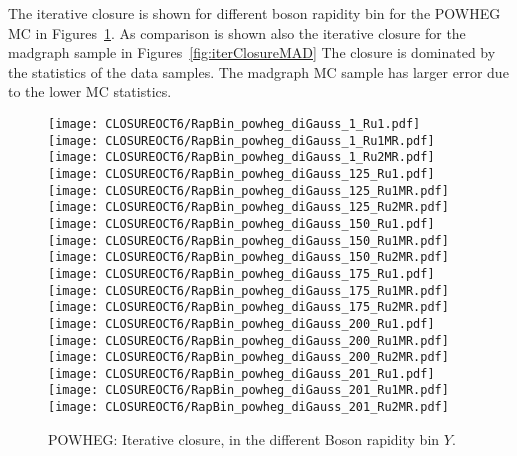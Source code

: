 \documentclass[41pt,a4paper,oneside]{report}
\begin{document}
The iterative closure is shown for different boson rapidity bin for the POWHEG MC in Figures~\ref{fig:iterClosurePOW}.
As comparison is shown also the iterative closure for the madgraph sample in Figures~\ref{fig:iterClosureMAD}
The closure is dominated by the statistics of the data samples. 
The madgraph MC sample has larger error due to the lower MC statistics.

\begin{figure}[h!]
  \begin{center}
    \texttt{[image: CLOSUREOCT6/RapBin\_powheg\_diGauss\_1\_Ru1.pdf]}
    \texttt{[image: CLOSUREOCT6/RapBin\_powheg\_diGauss\_1\_Ru1MR.pdf]}
    \texttt{[image: CLOSUREOCT6/RapBin\_powheg\_diGauss\_1\_Ru2MR.pdf]}
    \texttt{[image: CLOSUREOCT6/RapBin\_powheg\_diGauss\_125\_Ru1.pdf]}
    \texttt{[image: CLOSUREOCT6/RapBin\_powheg\_diGauss\_125\_Ru1MR.pdf]}
    \texttt{[image: CLOSUREOCT6/RapBin\_powheg\_diGauss\_125\_Ru2MR.pdf]}
    \texttt{[image: CLOSUREOCT6/RapBin\_powheg\_diGauss\_150\_Ru1.pdf]}
    \texttt{[image: CLOSUREOCT6/RapBin\_powheg\_diGauss\_150\_Ru1MR.pdf]}
    \texttt{[image: CLOSUREOCT6/RapBin\_powheg\_diGauss\_150\_Ru2MR.pdf]}
    \texttt{[image: CLOSUREOCT6/RapBin\_powheg\_diGauss\_175\_Ru1.pdf]}
    \texttt{[image: CLOSUREOCT6/RapBin\_powheg\_diGauss\_175\_Ru1MR.pdf]}
    \texttt{[image: CLOSUREOCT6/RapBin\_powheg\_diGauss\_175\_Ru2MR.pdf]}
    \texttt{[image: CLOSUREOCT6/RapBin\_powheg\_diGauss\_200\_Ru1.pdf]}
    \texttt{[image: CLOSUREOCT6/RapBin\_powheg\_diGauss\_200\_Ru1MR.pdf]}
    \texttt{[image: CLOSUREOCT6/RapBin\_powheg\_diGauss\_200\_Ru2MR.pdf]}
    \texttt{[image: CLOSUREOCT6/RapBin\_powheg\_diGauss\_201\_Ru1.pdf]}
    \texttt{[image: CLOSUREOCT6/RapBin\_powheg\_diGauss\_201\_Ru1MR.pdf]}
    \texttt{[image: CLOSUREOCT6/RapBin\_powheg\_diGauss\_201\_Ru2MR.pdf]}
    \caption{POWHEG: Iterative closure, in the different Boson rapidity bin $Y$.}
    \label{fig:iterClosurePOW}
  \end{center}
\end{figure}
\end{document}
